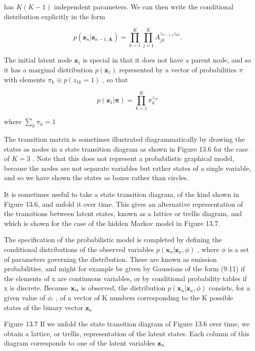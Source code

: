 \documentclass[
  10
]{article}
\begin{document}
has \(K ( K { - } 1 )\) independent parameters. We can then write the
conditional distribution explicitly in the form

\[
p (\mathbf {z} _ {n} | \mathbf {z} _ {n - 1, \mathbf {A}}) = \prod_ {k = 1} ^ {K} \prod_ {j = 1} ^ {K} A _ {j k} ^ {z _ {n - 1, j} z _ {n k}}.\tag{13.7}
\]

The initial latent node \(\mathbf { z } _ { 1 }\) is special in that it
does not have a parent node, and so it has a marginal distribution
\(p ( \mathbf { z } _ { 1 } )\) represented by a vector of probabilities
\(\pi\) with elements \(\pi _ { k } \equiv p ( z _ { 1 k } = 1 )\) , so
that

\[
p (\mathbf {z} _ {1} | \boldsymbol {\pi}) = \prod_ {k = 1} ^ {K} \pi_ {k} ^ {z _ {1 k}}\tag{13.8}
\]

where \(\textstyle \sum _ { k } \pi _ { k } = 1\)

The transition matrix is sometimes illustrated diagrammatically by
drawing the states as nodes in a state transition diagram as shown in
Figure 13.6 for the case of \(K = 3\) . Note that this does not
represent a probabilistic graphical model, because the nodes are not
separate variables but rather states of a single variable, and so we
have shown the states as boxes rather than circles.

It is sometimes useful to take a state transition diagram, of the kind
shown in Figure 13.6, and unfold it over time. This gives an alternative
representation of the transitions between latent states, known as a
lattice or trellis diagram, and which is shown for the case of the
hidden Markov model in Figure 13.7.

The specification of the probabilistic model is completed by defining
the conditional distributions of the observed variables
\(p ( \mathbf { x } _ { n } | \mathbf { z } _ { n } , \phi )\) , where
\(\phi\) is a set of parameters governing the distribution. These are
known as emission probabilities, and might for example be given by
Gaussians of the form (9.11) if the elements of x are continuous
variables, or by conditional probability tables if x is discrete.
Because \({ \bf x } _ { n }\) is observed, the distribution
\(p ( \mathbf { x } _ { n } | \mathbf { z } _ { n } , \phi )\) consists,
for a given value of \(\phi .\) , of a vector of K numbers corresponding
to the K possible states of the binary vector \(\mathbf { z } _ { n }\)

Figure 13.7 If we unfold the state transition diagram of Figure 13.6
over time, we obtain a lattice, or trellis, representation of the latent
states. Each column of this diagram corresponds to one of the latent
variables \({ \bf z } _ { n }\)
\end{document}
